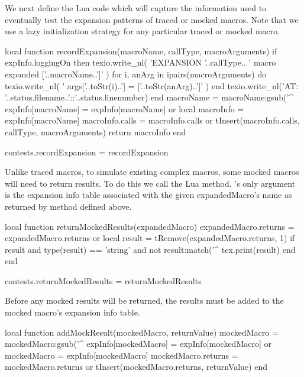 \def\stopLoggingExpansions{%
  \directlua{thirddata.contests.setExpansionLogging(false)}
}

\def\logMessage#1{%
  \writestatus{contests}{#1}#1\\
}
\stopMkIVCode

We next define the Lua code which will capture the information used to 
eventually test the expansion patterns of traced or mocked macros. Note 
that we use a lazy initialization strategy for any particular traced or 
mocked macro. 

\startLuaCode
local function recordExpansion(macroName,
                               callType,
                               macroArguments)
  if expInfo.loggingOn then
    texio.write_nl(
      'EXPANSION '..callType..
      ' macro expanded ['..macroName..']'
    )
    for i, anArg in ipairs(macroArguments) do
      texio.write_nl(
        '  args['..toStr(i)..'] = ['..toStr(anArg)..']'
      )
    end
    texio.write_nl('AT: '..status.filename..'::'..status.linenumber)
  end
  macroName = macroName:gsub('^%
  expInfo[macroName] = expInfo[macroName] or { }
  local macroInfo    = expInfo[macroName]
  macroInfo.calls    = macroInfo.calls or { }
  tInsert(macroInfo.calls, { callType, macroArguments})
  return macroInfo
end

contests.recordExpansion = recordExpansion
\stopLuaCode

Unlike traced macros, to simulate existing complex macros, some mocked 
macros will need to return  results. To do this we call the 
 Lua method. 's only 
argument is the expansion info table associated with the given 
expandedMacro's name as returned by  method defined 
above. 

\startLuaCode
local function returnMockedResults(expandedMacro)
  expandedMacro.returns = expandedMacro.returns or { }
  local result = tRemove(expandedMacro.returns, 1)
  if result and 
     type(result) == 'string' and
     not result:match('^%
    tex.print(result)
  end
end

contests.returnMockedResults = returnMockedResults
\stopLuaCode

Before any mocked results will be returned, the  results 
must be added to the mocked macro's expansion info table. 

\startLuaCode
local function addMockResult(mockedMacro, returnValue)
  mockedMacro = mockedMacro:gsub('^%
  expInfo[mockedMacro] = expInfo[mockedMacro] or { }
  mockedMacro          = expInfo[mockedMacro]
  mockedMacro.returns  = mockedMacro.returns or { }
  tInsert(mockedMacro.returns, returnValue)
end

